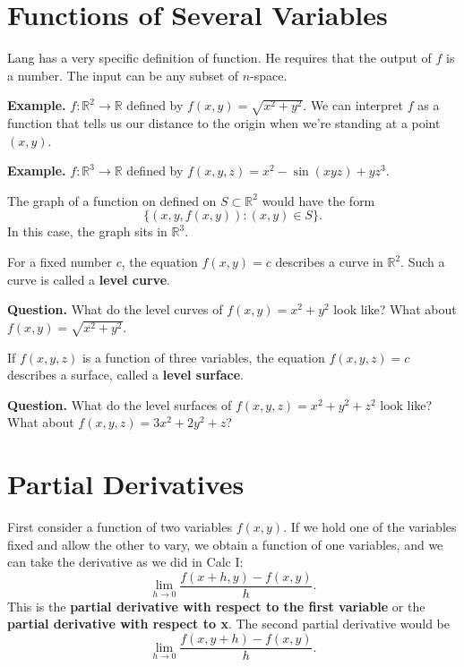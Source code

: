 \documentclass{article}
\begin{document}




\section*{Functions of Several Variables}

Lang has a very specific definition of function. He requires that 
the output of $f$ is a number. The input can be any subset of $n$-space.


\textbf{Example.} $f: \mathbb{R}^2 \rightarrow \mathbb{R}$ defined by
$f(x,y)=\sqrt{x^2+y^2}$. We can interpret $f$ as a function that 
tells us our distance to the origin when we're standing at a point
$(x,y)$.

\textbf{Example.} $f: \mathbb{R}^3 \rightarrow \mathbb{R}$ defined 
by $f(x,y,z) = x^2 - \sin(xyz) + yz^3$.

The graph of a function on defined on $S\subset \mathbb{R}^2$ would have the form
\[ \{ (x,y,f(x,y)) : (x,y) \in S\}.\]
In this case, the graph sits in $\mathbb{R}^3$.

For a fixed number $c$, the equation $f(x,y)=c$ describes a curve
in $\mathbb{R}^2$. Such a curve is called a \textbf{level curve}.

\textbf{Question.} What do the level curves of $f(x,y) = x^2 + y^2$ look like? What about $f(x,y) = \sqrt{x^2+y^2}$.


If $f(x,y,z)$ is a function of three variables, the equation $f(x,y,z)=c$
describes a surface, called a \textbf{level surface}.

\textbf{Question.} What do the level surfaces of $f(x,y,z) = x^2 + y^2 + z^2$ look like?
What about $f(x,y,z) = 3x^2 + 2y^2 + z$?


\section*{Partial Derivatives}

First consider a function of two variables $f(x,y)$. If we hold one of the variables
fixed and allow the other to vary, we obtain a function of one variables, and we
can take the derivative as we did in Calc I:
\[\lim_{h \to 0} \frac{f(x+h,y)-f(x,y)}{h}.\]
This is the \textbf{partial derivative with respect to the first variable} or the 
\textbf{partial derivative with respect to x}. The second partial derivative would be 
\[\lim_{h \to 0} \frac{f(x,y+h)-f(x,y)}{h}.\]
\end{document}
